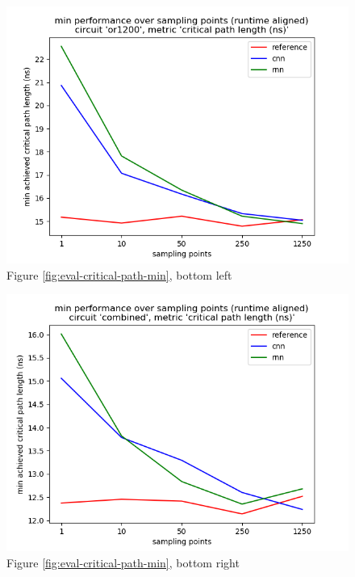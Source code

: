 \begin{figure}[H]
\includegraphics[width=\linewidth]{plots/eval-or1200-critical-path-min-full.png}
\caption{Figure \ref{fig:eval-critical-path-min}, bottom left}
\end{figure}

\begin{figure}[H]
\includegraphics[width=\linewidth]{plots/eval-combined-critical-path-min-full.png}
\caption{Figure \ref{fig:eval-critical-path-min}, bottom right}
\end{figure}